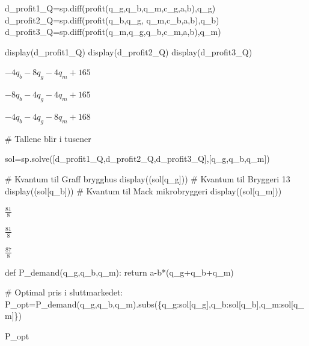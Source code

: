 \documentclass[
  12pt,
  a4paper,
  DIV=11,
  numbers=noendperiod]{scrartcl}
\newenvironment{Shaded}{\begin{snugshade}}{\end{snugshade}}
\newcommand{\CommentTok}[1]{\textcolor[rgb]{0.37,0.37,0.37}{#1}}
\newcommand{\ControlFlowTok}[1]{\textcolor[rgb]{0.00,0.23,0.31}{#1}}
\newcommand{\KeywordTok}[1]{\textcolor[rgb]{0.00,0.23,0.31}{#1}}
\newcommand{\NormalTok}[1]{\textcolor[rgb]{0.00,0.23,0.31}{#1}}
\newcommand{\OperatorTok}[1]{\textcolor[rgb]{0.37,0.37,0.37}{#1}}
\begin{document}
\begin{Shaded}
\begin{Highlighting}[]
\NormalTok{d\_profit1\_Q}\OperatorTok{=}\NormalTok{sp.diff(profit(q\_g,q\_b,q\_m,c\_g,a,b),q\_g)}
\NormalTok{d\_profit2\_Q}\OperatorTok{=}\NormalTok{sp.diff(profit(q\_b,q\_g, q\_m,c\_b,a,b),q\_b)}
\NormalTok{d\_profit3\_Q}\OperatorTok{=}\NormalTok{sp.diff(profit(q\_m,q\_g,q\_b,c\_m,a,b),q\_m)}


\NormalTok{display(d\_profit1\_Q)}
\NormalTok{display(d\_profit2\_Q)}
\NormalTok{display(d\_profit3\_Q)}
\end{Highlighting}
\end{Shaded}

$\displaystyle - 4 q_{b} - 8 q_{g} - 4 q_{m} + 165$

$\displaystyle - 8 q_{b} - 4 q_{g} - 4 q_{m} + 165$

$\displaystyle - 4 q_{b} - 4 q_{g} - 8 q_{m} + 168$

\begin{Shaded}
\begin{Highlighting}[]
\CommentTok{\# Tallene blir i tusener}

\NormalTok{sol}\OperatorTok{=}\NormalTok{sp.solve([d\_profit1\_Q,d\_profit2\_Q,d\_profit3\_Q],[q\_g,q\_b,q\_m])}

\CommentTok{\# Kvantum til Graff brygghus}
\NormalTok{display((sol[q\_g]))}
\CommentTok{\# Kvantum til Bryggeri 13}
\NormalTok{display((sol[q\_b]))}
\CommentTok{\# Kvantum til Mack mikrobryggeri}
\NormalTok{display((sol[q\_m]))}
\end{Highlighting}
\end{Shaded}

$\displaystyle \frac{81}{8}$

$\displaystyle \frac{81}{8}$

$\displaystyle \frac{87}{8}$

\begin{Shaded}
\begin{Highlighting}[]
\KeywordTok{def}\NormalTok{ P\_demand(q\_g,q\_b,q\_m):}
    \ControlFlowTok{return}\NormalTok{ a}\OperatorTok{{-}}\NormalTok{b}\OperatorTok{*}\NormalTok{(q\_g}\OperatorTok{+}\NormalTok{q\_b}\OperatorTok{+}\NormalTok{q\_m)}

\CommentTok{\# Optimal pris i sluttmarkedet:}
\NormalTok{P\_opt}\OperatorTok{=}\NormalTok{P\_demand(q\_g,q\_b,q\_m).subs(\{q\_g:sol[q\_g],q\_b:sol[q\_b],q\_m:sol[q\_m]\})}

\NormalTok{P\_opt}
\end{Highlighting}
\end{Shaded}
\end{document}
